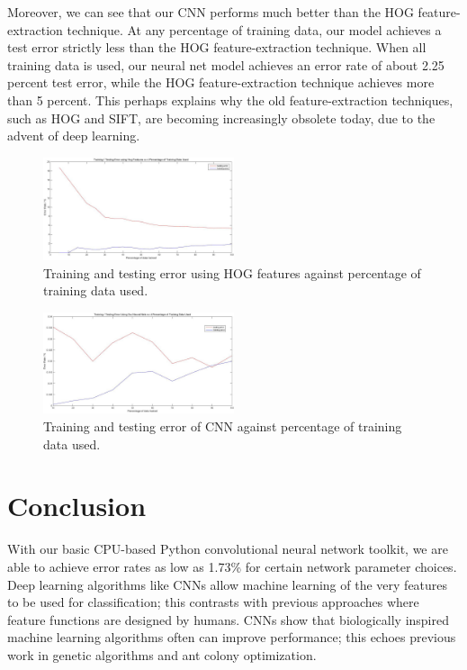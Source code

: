 \documentclass[10pt,twocolumn]{article}
\begin{document}
Moreover, we can see that our CNN performs much better than the HOG feature-extraction technique. At any percentage of training data, our model achieves a test error strictly less than the HOG feature-extraction technique. When all training data is used, our neural net model achieves an error rate of about 2.25 percent test error, while the HOG feature-extraction technique achieves more than 5 percent. This perhaps explains why the old feature-extraction techniques, such as HOG and SIFT, are becoming increasingly obsolete today, due to the advent of deep learning.

\begin{figure}
\includegraphics[width = 0.5\textwidth]{figure/hog}
\caption{Training and testing error using HOG features against percentage of training data used.}
\label{fig:hog}
\end{figure}

\begin{figure}
\includegraphics[width = 0.5\textwidth]{figure/neural_net_percentage_data}
\caption{Training and testing error of CNN against percentage of training data used.}
\label{fig:neural_net_percentage_data}
\end{figure}

\section{Conclusion} \label{sec:conclude}

With our basic CPU-based Python convolutional neural network toolkit, we are able to achieve error rates as low as 1.73\% for certain network parameter choices. Deep learning algorithms like CNNs allow machine learning of the very features to be used for classification; this contrasts with previous approaches where feature functions are designed by humans. CNNs show that biologically inspired machine learning algorithms often can improve performance; this echoes previous work in genetic algorithms and ant colony optimization.
\end{document}

